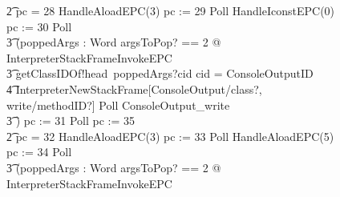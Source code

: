 \begin{figure}[tp!]
{\begin{circus}
    \t2 {} \circelse pc = 28 \circthen HandleAloadEPC(3) \circseq pc := 29 \circseq Poll \circseq HandleIconstEPC(0) \circseq pc := 30 \circseq Poll \circseq \\
    \t3 (\circvar poppedArgs : Word \circspot \lschexpract \exists argsToPop? == 2 @ InterpreterStackFrameInvokeEPC \rschexpract \circseq \\
    \t3 getClassIDOf!head~poppedArgs?cid \then \circif cid = ConsoleOutputID \circthen {} \\
    \t4 \lschexpract InterpreterNewStackFrame[ConsoleOutput/class?, write/methodID?] \rschexpract \circseq  Poll \circseq ConsoleOutput\_write \\
    \t3 \circfi) \circseq pc := 31 \circseq Poll \circseq pc := 35 \\
    \t2 {} \circelse pc = 32 \circthen HandleAloadEPC(3) \circseq pc := 33 \circseq Poll \circseq HandleAloadEPC(5) \circseq pc := 34 \circseq Poll \circseq \\
    \t3 (\circvar poppedArgs : Word \circspot \lschexpract \exists argsToPop? == 2 @ InterpreterStackFrameInvokeEPC \rschexpract \circseq \\

\end{circus}}
\end{figure}
